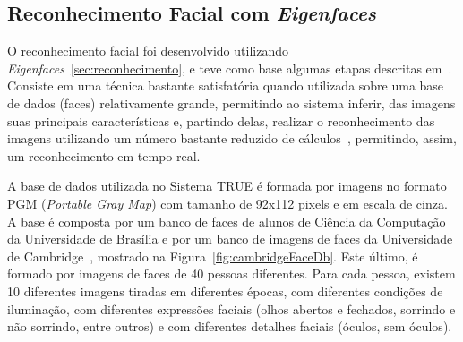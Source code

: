 	\subsection{Reconhecimento Facial com \textit{Eigenfaces}}

		O reconhecimento facial foi desenvolvido utilizando
		\textit{Eigenfaces}~\ref{sec:reconhecimento}, e teve como base algumas etapas descritas em~\cite{shervin}. Consiste em uma técnica bastante satisfatória quando utilizada sobre uma base de dados (faces) relativamente grande, permitindo ao sistema inferir, das imagens suas principais características e, partindo delas, realizar o reconhecimento das imagens utilizando um número bastante reduzido de cálculos~\cite{artigo-eigenface}, permitindo, assim, um reconhecimento em tempo real.

		A base de dados utilizada no Sistema TRUE é formada por imagens no formato PGM (\textit{Portable Gray Map}) com tamanho de 92x112 pixels e em escala de cinza. A base é composta por um banco de faces de alunos de Ciência da Computação da Universidade de Brasília e por um banco de imagens de faces da Universidade de Cambridge~\cite{cambridgeFaceDb}, mostrado na Figura~\ref{fig:cambridgeFaceDb}. Este último, é formado por imagens de faces de 40 pessoas diferentes. Para cada pessoa, existem 10 diferentes imagens tiradas em diferentes épocas, com diferentes condições de iluminação, com diferentes expressões faciais (olhos abertos e fechados, sorrindo e não sorrindo, entre outros) e com diferentes detalhes faciais (óculos, sem óculos). 

